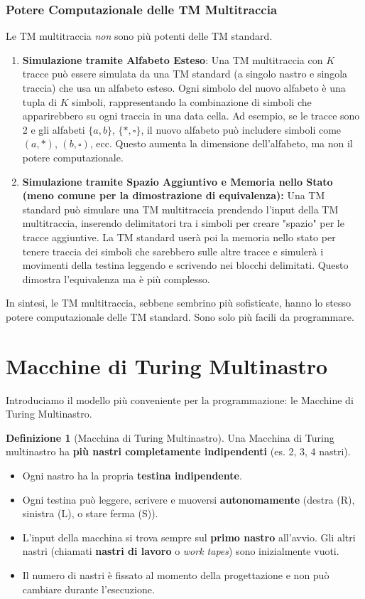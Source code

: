 \documentclass[a4paper]{article}
\theoremstyle{definition} %
\newtheorem{definition}{Definizione}
\newcommand{\blankS}{\ensuremath{\square}}
\begin{document}
\subsubsection{Potere Computazionale delle TM Multitraccia}
Le TM multitraccia \emph{non} sono più potenti delle TM standard.
\begin{enumerate}
    \item \textbf{Simulazione tramite Alfabeto Esteso}:
    Una TM multitraccia con $K$ tracce può essere simulata da una TM standard (a singolo nastro e singola traccia) che usa un alfabeto esteso. Ogni simbolo del nuovo alfabeto è una tupla di $K$ simboli, rappresentando la combinazione di simboli che apparirebbero su ogni traccia in una data cella. Ad esempio, se le tracce sono 2 e gli alfabeti $\{a,b\}$, $\{*, \blankS\}$, il nuovo alfabeto può includere simboli come $(a, *)$, $(b, \blankS)$, ecc. Questo aumenta la dimensione dell'alfabeto, ma non il potere computazionale.
    \item \textbf{Simulazione tramite Spazio Aggiuntivo e Memoria nello Stato (meno comune per la dimostrazione di equivalenza):}
    Una TM standard può simulare una TM multitraccia prendendo l'input della TM multitraccia, inserendo delimitatori tra i simboli per creare "spazio" per le tracce aggiuntive. La TM standard userà poi la memoria nello stato per tenere traccia dei simboli che sarebbero sulle altre tracce e simulerà i movimenti della testina leggendo e scrivendo nei blocchi delimitati. Questo dimostra l'equivalenza ma è più complesso.
\end{enumerate}
In sintesi, le TM multitraccia, sebbene sembrino più sofisticate, hanno lo stesso potere computazionale delle TM standard. Sono solo più facili da programmare.

\section{Macchine di Turing Multinastro}
Introduciamo il modello più conveniente per la programmazione: le Macchine di Turing Multinastro.

\begin{definition}[Macchina di Turing Multinastro]
Una Macchina di Turing multinastro ha \textbf{più nastri completamente indipendenti} (es. 2, 3, 4 nastri).
\begin{itemize}
    \item Ogni nastro ha la propria \textbf{testina indipendente}.
    \item Ogni testina può leggere, scrivere e muoversi \textbf{autonomamente} (destra (R), sinistra (L), o stare ferma (S)).
    \item L'input della macchina si trova sempre sul \textbf{primo nastro} all'avvio. Gli altri nastri (chiamati \textbf{nastri di lavoro} o \emph{work tapes}) sono inizialmente vuoti.
    \item Il numero di nastri è fissato al momento della progettazione e non può cambiare durante l'esecuzione.
\end{itemize}
\end{definition}
\end{document}
